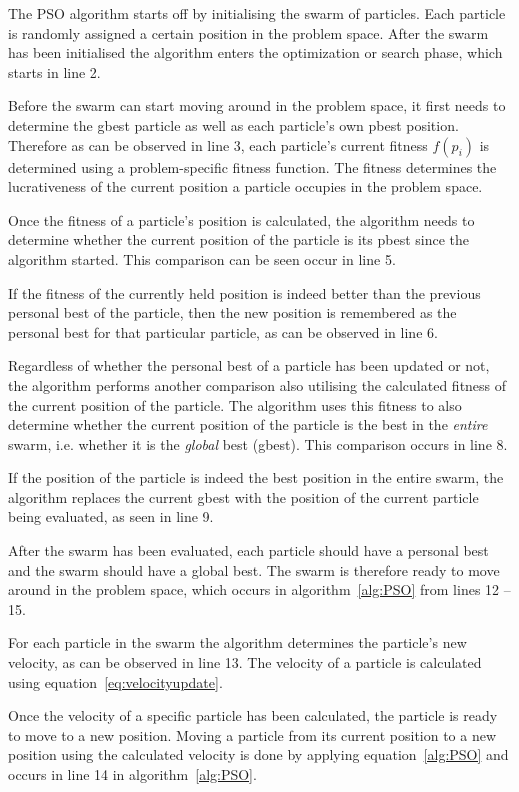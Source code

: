 The \gls{PSO} algorithm starts off by initialising the swarm of particles. Each particle is randomly assigned a certain position in the problem space. After the swarm has been initialised the algorithm enters the optimization or search phase, which starts in line 2.

Before the swarm can start moving around in the problem space, it first needs to determine the gbest particle as well as each particle's own pbest position. Therefore as can be observed in line 3, each particle's current fitness $f(p_i)$ is determined using a problem-specific fitness function. The fitness determines the lucrativeness of the current position a particle occupies in the problem space.

Once the fitness of a particle's position is calculated, the algorithm needs to determine whether the current position of the particle is its pbest since the algorithm started. This comparison can be seen occur in line 5. 

If the fitness of the currently held position is indeed better than the previous personal best of the particle, then the new position is remembered as the personal best for that particular particle, as can be observed in line 6.

Regardless of whether the personal best of a particle has been updated or not, the algorithm performs another comparison also utilising the calculated fitness of the current position of the particle. The algorithm uses this fitness to also determine whether the current position of the particle is the best in the \emph{entire} swarm, i.e. whether it is  the \emph{global} best (gbest). This comparison occurs in line  8.

If the position of the particle is indeed the best position in the entire swarm, the algorithm replaces the current gbest with the position of the current particle being evaluated, as seen in line 9.

After the swarm has been evaluated, each particle should have a personal best and the swarm should have a global best. The swarm is therefore ready to move around in the problem space, which occurs in algorithm~\ref{alg:PSO} from lines 12 -- 15.

For each particle in the swarm the algorithm determines the particle's new velocity, as can be observed in line 13. The velocity of a particle is calculated using equation~\ref{eq:velocityupdate}. 

Once the velocity of a specific particle has been calculated, the particle is ready to move to a new position. Moving a particle from its current position to a new position using the calculated velocity is done by applying equation~\ref{alg:PSO} and occurs in line 14 in algorithm~\ref{alg:PSO}.

